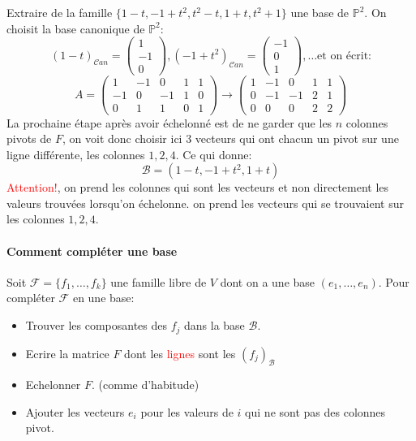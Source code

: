 \begin{exemple}
    Extraire de la famille $\{1 - t, -1 + t^2, t^2 - t, 1 + t, t^2 + 1\}$ une base de $\mathbb{P}^2$. On choisit la base canonique de $\mathbb{P}^2$:
    \[(1-t)_{\mathcal{C}an} = \begin{pmatrix}
        1 \\ -1 \\ 0
    \end{pmatrix}, (-1+t^2)_{\mathcal{C}an} = \begin{pmatrix}
        -1 \\ 0 \\ 1
    \end{pmatrix}, \dots \text{et on écrit:}\]
    \[A = \begin{pmatrix}
         1 &-1&0 & 1 & 1 \\
        -1&0&-1&1&0\\
         0&1&1&0&1
    \end{pmatrix} \to \begin{pmatrix}
         1 &-1&0 & 1 & 1 \\
        0&-1&-1&2&1\\
         0&0&0&2&2
    \end{pmatrix}\]
    La prochaine étape après avoir échelonné est de ne garder que les $n$ colonnes pivots de $F$, on voit donc choisir ici $3$ vecteurs qui ont chacun un pivot sur une ligne différente, les colonnes $1, 2, 4$. Ce qui donne:
    \[\mathcal{B} = (1-t, -1+t^2, 1+t)\] \textcolor{red}{Attention!}, on prend les colonnes qui sont les vecteurs et non directement les valeurs trouvées lorsqu'on échelonne. on prend les vecteurs qui se trouvaient sur les colonnes $1, 2, 4$.
\end{exemple}

\paragraph{Comment compléter une base}
Soit $\mathcal{F} = \{f_1, \dots, f_k\}$ une famille libre de $V$ dont on a une base $(e_1, \dots, e_n)$. Pour compléter $\mathcal{F}$ en une base:
\begin{itemize}
    \item Trouver les composantes des $f_j$ dans la base $\mathcal{B}$.
    \item Ecrire la matrice $F$ dont les \textcolor{red}{lignes} sont les $(f_j)_{\mathcal{B}}$
    \item Echelonner $F$. (comme d'habitude)
    \item Ajouter les vecteurs $e_i$ pour les valeurs de $i$ qui ne sont pas des colonnes pivot.
\end{itemize}

